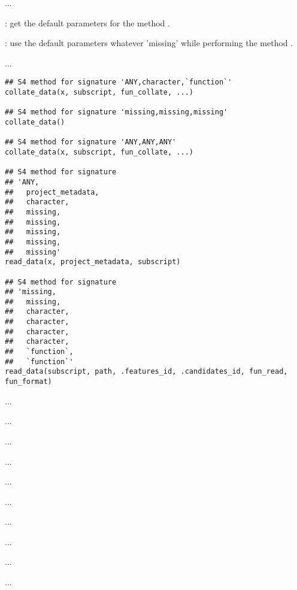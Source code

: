 \documentclass[letterpaper]{book}
\begin{document}
%
\begin{Description}\relax
...

: get the default parameters for the method
.

: use the default parameters whatever 'missing'
while performing the method .

...
\end{Description}
%
\begin{Usage}
\begin{verbatim}
## S4 method for signature 'ANY,character,`function`'
collate_data(x, subscript, fun_collate, ...)

## S4 method for signature 'missing,missing,missing'
collate_data()

## S4 method for signature 'ANY,ANY,ANY'
collate_data(x, subscript, fun_collate, ...)

## S4 method for signature 
## 'ANY,
##   project_metadata,
##   character,
##   missing,
##   missing,
##   missing,
##   missing,
##   missing'
read_data(x, project_metadata, subscript)

## S4 method for signature 
## 'missing,
##   missing,
##   character,
##   character,
##   character,
##   character,
##   `function`,
##   `function`'
read_data(subscript, path, .features_id, .candidates_id, fun_read, fun_format)
\end{verbatim}
\end{Usage}
%
\begin{Arguments}
\begin{ldescription}
\item[\code{x}] ...

\item[\code{subscript}] ...

\item[\code{fun\_collate}] ...

\item[\code{...}] ...

\item[\code{project\_metadata}] ...

\item[\code{path}] ...

\item[\code{.features\_id}] ...

\item[\code{.candidates\_id}] ...

\item[\code{fun\_read}] ...

\item[\code{fun\_format}] ...
\end{ldescription}
\end{Arguments}
\end{document}
